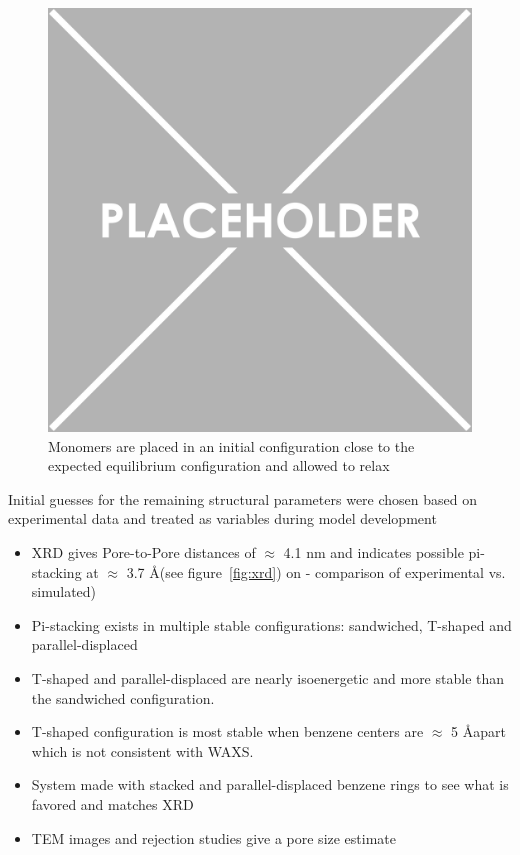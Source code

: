 \documentclass{article}
\newcommand{\angstrom}{\textup{\AA}}
\begin{document}
	\begin{figure}
	\includegraphics{placeholder.png}
		\caption{Monomers are placed in an initial configuration close to the expected equilibrium configuration and allowed to relax}
		\label{fig:initial}
	\end{figure}

	\noindent Initial guesses for the remaining structural parameters were chosen based on experimental data and treated as variables during model development 
	\begin{itemize}
		\item XRD gives Pore-to-Pore distances of $\approx$ 4.1 nm and indicates possible pi-stacking at $\approx$ 3.7 \angstrom (see figure~\ref{fig:xrd}) on - comparison of experimental vs. simulated)
		\item Pi-stacking exists in multiple stable configurations: sandwiched, T-shaped and parallel-displaced
		\item T-shaped and parallel-displaced are nearly isoenergetic and more stable than the sandwiched configuration.
		\item T-shaped configuration is most stable when benzene centers are $\approx$ 5 \angstrom apart which is not consistent with WAXS. %
		\item System made with stacked and parallel-displaced benzene rings to see what is favored and matches XRD
		\item TEM images and rejection studies give a pore size estimate
	\end{itemize}
\end{document}

